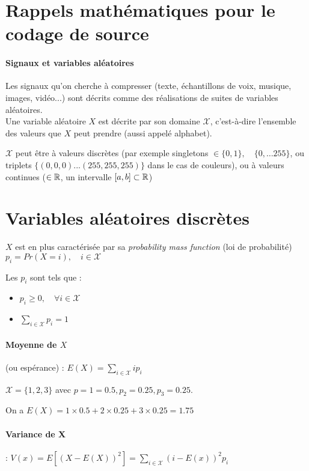 \documentclass[main.tex]{subfile}
\begin{document}
\newcommand{\X}{\mathcal{X}}
\section{Rappels mathématiques pour le codage de source}

\paragraph{Signaux et variables aléatoires}
Les signaux qu'on cherche à compresser (texte, échantillons de voix, musique, images, vidéo...) sont décrits comme des réalisations de suites de variables aléatoires.\\

Une variable aléatoire $X$ est décrite par son domaine $\X$, c'est-à-dire l'ensemble des valeurs que $X$ peut prendre (aussi appelé alphabet).

$\X$ peut être à valeurs discrètes (par exemple singletons $\in\{0,1\}, \quad \{0,\dots 255\}$,  ou triplets $\{(0,0,0)...(255,255,255)\}$ dans le cas de couleurs), ou à valeurs continues ($\in \mathbb{R}$, un intervalle $[a,b]\subset\mathbb{R}$)

\section{Variables aléatoires discrètes}

$X$ est en plus caractérisée par sa \emph{probability mass function} (loi de probabilité) $p_i = Pr(X=i), \quad i \in \X$

Les $p_i$ sont tels que :
\begin{itemize}
\item $p_i \geq 0, \quad \forall i \in \X$
\item $\sum_{i \in \X}p_i = 1$
\end{itemize}

\medskip

\paragraph{Moyenne de $X$} (ou espérance) : $E(X)=\sum_{i \in \X} i p_i$

\begin{example}
$\X=\{1,2,3\}$ avec $p=1 = 0.5, p_2=0.25, p_3=0.25$.

On a $E(X) = 1\times0.5 + 2\times0.25 + 3\times0.25 = 1.75$
\end{example}

\paragraph{Variance de X} : $V(x)=E[(X-E(X))^2] = \sum_{i\in\X} (i-E(x))^2p_i$
\end{document}
